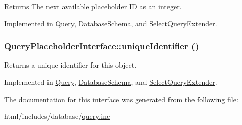 \begin{DoxyReturn}{Returns}
The next available placeholder ID as an integer. 
\end{DoxyReturn}


Implemented in \hyperlink{classQuery_a6932a635e623d74c7ae111742818b6b8}{Query}, \hyperlink{classDatabaseSchema_a25bdbd4eb743fcd4db4809451ad5e8c9}{DatabaseSchema}, and \hyperlink{classSelectQueryExtender_a202a005bca32569d69f1cc20acdb8ccb}{SelectQueryExtender}.\hypertarget{interfaceQueryPlaceholderInterface_a5f4eb118f1894f0b5785d78d4dbe9847}{
\subsubsection[{uniqueIdentifier}]{\setlength{\rightskip}{0pt plus 5cm}QueryPlaceholderInterface::uniqueIdentifier ()}}
\label{interfaceQueryPlaceholderInterface_a5f4eb118f1894f0b5785d78d4dbe9847}
Returns a unique identifier for this object. 

Implemented in \hyperlink{classQuery_afa7ba2c63e278d4d585bd1ff70e0c237}{Query}, \hyperlink{classDatabaseSchema_a50324931213b40d68037c184a0061cf0}{DatabaseSchema}, and \hyperlink{classSelectQueryExtender_a4bb30825327565c94e01b4f5a785a5ed}{SelectQueryExtender}.

The documentation for this interface was generated from the following file:\begin{DoxyCompactItemize}
\item 
html/includes/database/\hyperlink{query_8inc}{query.inc}\end{DoxyCompactItemize}
